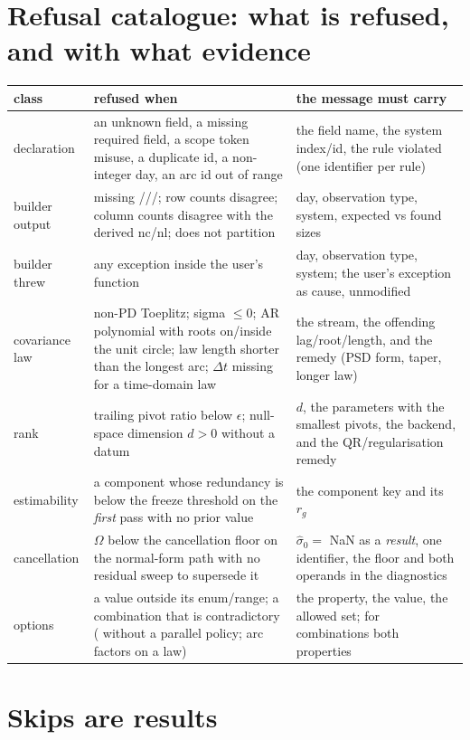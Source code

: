\section{Refusal catalogue: what is refused, and with what evidence}

\begin{longtable}{@{}P{30mm}P{54mm}P{70mm}@{}}
\toprule
class & refused when & the message must carry\\
\midrule
declaration & an unknown field, a missing required field, a scope token misuse, a duplicate id, a non-integer day, an arc id out of range & the field name, the system index/id, the rule violated (one identifier per rule)\\
builder output & missing ///; row counts disagree; column counts disagree with the derived nc/nl;  does not partition & day, observation type, system, expected vs found sizes\\
builder threw & any exception inside the user's function & day, observation type, system; the user's exception as cause, unmodified\\
covariance law & non-PD Toeplitz; sigma $\le 0$; AR polynomial with roots on/inside the unit circle; law length shorter than the longest arc; $\Delta t$ missing for a time-domain law & the stream, the offending lag/root/length, and the remedy (PSD form, taper, longer law)\\
rank & trailing pivot ratio below $\epsilon$; null-space dimension $d>0$ without a datum & $d$, the parameters with the smallest pivots, the backend, and the QR/regularisation remedy\\
estimability & a component whose redundancy is below the freeze threshold on the \emph{first} pass with no prior value & the component key and its $r_g$\\
cancellation & $\Omega$ below the cancellation floor on the normal-form path with no residual sweep to supersede it & $\hat\sigma_0 = $ NaN as a \emph{result}, one identifier, the floor and both operands in the diagnostics\\
options & a value outside its enum/range; a combination that is contradictory ( without a parallel policy; arc factors on a  law) & the property, the value, the allowed set; for combinations both properties\\
\bottomrule
\end{longtable}

\section{Skips are results}
\label{sec:skips}

